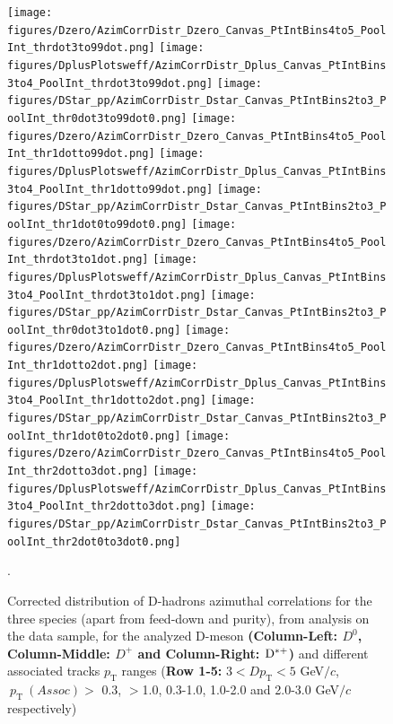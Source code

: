 \begin{figure}[hp]
\centering
{\texttt{[image: figures/Dzero/AzimCorrDistr\_Dzero\_Canvas\_PtIntBins4to5\_PoolInt\_thrdot3to99dot.png]}}
{\texttt{[image: figures/DplusPlotsweff/AzimCorrDistr\_Dplus\_Canvas\_PtIntBins3to4\_PoolInt\_thrdot3to99dot.png]}}
{\texttt{[image: figures/DStar\_pp/AzimCorrDistr\_Dstar\_Canvas\_PtIntBins2to3\_PoolInt\_thr0dot3to99dot0.png]}}
{\texttt{[image: figures/Dzero/AzimCorrDistr\_Dzero\_Canvas\_PtIntBins4to5\_PoolInt\_thr1dotto99dot.png]}}
{\texttt{[image: figures/DplusPlotsweff/AzimCorrDistr\_Dplus\_Canvas\_PtIntBins3to4\_PoolInt\_thr1dotto99dot.png]}}
{\texttt{[image: figures/DStar\_pp/AzimCorrDistr\_Dstar\_Canvas\_PtIntBins2to3\_PoolInt\_thr1dot0to99dot0.png]}}
{\texttt{[image: figures/Dzero/AzimCorrDistr\_Dzero\_Canvas\_PtIntBins4to5\_PoolInt\_thrdot3to1dot.png]}}
{\texttt{[image: figures/DplusPlotsweff/AzimCorrDistr\_Dplus\_Canvas\_PtIntBins3to4\_PoolInt\_thrdot3to1dot.png]}}
{\texttt{[image: figures/DStar\_pp/AzimCorrDistr\_Dstar\_Canvas\_PtIntBins2to3\_PoolInt\_thr0dot3to1dot0.png]}}
{\texttt{[image: figures/Dzero/AzimCorrDistr\_Dzero\_Canvas\_PtIntBins4to5\_PoolInt\_thr1dotto2dot.png]}}
{\texttt{[image: figures/DplusPlotsweff/AzimCorrDistr\_Dplus\_Canvas\_PtIntBins3to4\_PoolInt\_thr1dotto2dot.png]}}
{\texttt{[image: figures/DStar\_pp/AzimCorrDistr\_Dstar\_Canvas\_PtIntBins2to3\_PoolInt\_thr1dot0to2dot0.png]}}
{\texttt{[image: figures/Dzero/AzimCorrDistr\_Dzero\_Canvas\_PtIntBins4to5\_PoolInt\_thr2dotto3dot.png]}}
{\texttt{[image: figures/DplusPlotsweff/AzimCorrDistr\_Dplus\_Canvas\_PtIntBins3to4\_PoolInt\_thr2dotto3dot.png]}}
{\texttt{[image: figures/DStar\_pp/AzimCorrDistr\_Dstar\_Canvas\_PtIntBins2to3\_PoolInt\_thr2dot0to3dot0.png]}}
\caption{Corrected distribution of D-hadrons azimuthal correlations for the three species (apart from feed-down and purity), from analysis on the data sample, for the analyzed D-meson \textbf{(Column-Left: $D^0$, Column-Middle: $D^+$ and Column-Right: ${\rm D^{*+}}$)} and different associated tracks $p_\text{T}$ ranges (\textbf{Row 1-5:} $3 < D p_\text{T} < 5$ GeV$/c$, $ \ p_\text{T}~(Assoc)>$ 0.3, $>$1.0,  0.3-1.0, 1.0-2.0 and 2.0-3.0 GeV$/c$ respectively)}.
\label{fig:DataD0DpDs1}
\end{figure}

\clearpage
\newpage

